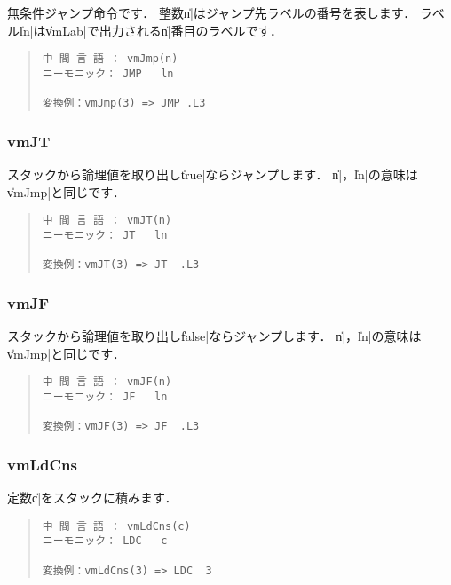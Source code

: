 無条件ジャンプ命令です．
整数\|n|はジャンプ先ラベルの番号を表します．
ラベル\|ln|は\|vmLab|で出力される\|n|番目のラベルです．

\begin{quote}
\begin{verbatim}
中 間 言 語 ： vmJmp(n)
ニーモニック： JMP   ln

変換例：vmJmp(3) => JMP .L3
\end{verbatim}
\end{quote}

\subsubsection{vmJT}

スタックから論理値を取り出し\|true|ならジャンプします．
\|n|，\|ln|の意味は\|vmJmp|と同じです．

\begin{quote}
\begin{verbatim}
中 間 言 語 ： vmJT(n)
ニーモニック： JT   ln

変換例：vmJT(3) => JT  .L3
\end{verbatim}
\end{quote}

\subsubsection{vmJF}

スタックから論理値を取り出し\|false|ならジャンプします．
\|n|，\|ln|の意味は\|vmJmp|と同じです．

\begin{quote}
\begin{verbatim}
中 間 言 語 ： vmJF(n)
ニーモニック： JF   ln

変換例：vmJF(3) => JF  .L3
\end{verbatim}
\end{quote}

\subsubsection{vmLdCns}

定数\|c|をスタックに積みます．

\begin{quote}
\begin{verbatim}
中 間 言 語 ： vmLdCns(c)
ニーモニック： LDC   c

変換例：vmLdCns(3) => LDC  3
\end{verbatim}
\end{quote}

